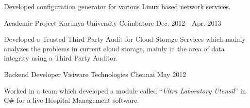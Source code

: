 \begin{cventries}
{\begin{cvitems}
        \item {Developed configuration generator for various Linux based network services.}
      \end{cvitems}
    }
  \cventry
    {Academic Project}
    {Karunya University}
    {Coimbatore}
    {Dec. 2012 - Apr. 2013}
    {
      \begin{cvitems}
        \item {Developed a Trusted Third Party Audit for Cloud Storage Services which mainly analyzes the problems in current cloud storage, mainly in the area of data integrity using a Third Party Auditor.}
      \end{cvitems}
    }
  \cventry
    {Backend Developer}
    {Visiware Technologies}
    {Chennai}
    {May 2012}
    {
      \begin{cvitems}
        \item {Worked in a team which developed a module called ``\emph{Ultra Laboratory Utensil}'' in C\# for a live Hospital Management software.}
      \end{cvitems}
    }
\end{cventries}
